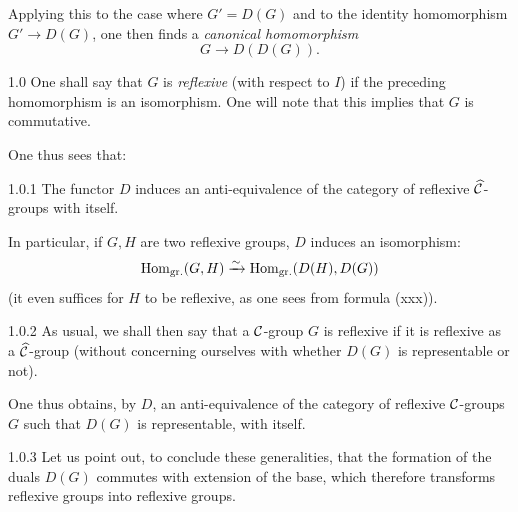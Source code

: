 Applying this to the case where $G'=D(G)$ and to the identity homomorphism $G'\to D(G)$, one then finds a \emph{canonical homomorphism}
\begin{equation}\tag{xxxx}
G\to D(D(G)).
\end{equation}
\begin{definition}{1.0}\label{VIII.1.0}
One shall say that $G$ is \emph{reflexive} (with respect to $I$) if the preceding homomorphism is an isomorphism. One will note that this implies that $G$ is commutative.
\end{definition}
One thus sees that:
\begin{proposition}{1.0.1}\label{VIII.1.0.1}
The functor $D$ induces an anti-equivalence of the category of reflexive $\widehat{\cal C}$-groups with itself.
\end{proposition}
In particular, if $G,H$ are two reflexive groups, $D$ induces an isomorphism:
\[
\Hom_{\mathrm{gr.}}(G,H)\isomto\Hom_{\mathrm{gr.}}(D(H),D(G))
\]
(it even suffices for $H$ to be reflexive, as one sees from formula (xxx)).
\begin{definition}{1.0.2}\label{VIII.1.0.2}
As usual, we shall then say that a $\cal C$-group $G$ is reflexive if it is reflexive as a $\widehat{\cal C}$-group (without concerning ourselves with whether $D(G)$ is representable or not).
\end{definition}
One thus obtains, by $D$, an anti-equivalence of the category of reflexive $\cal C$-groups $G$ such that $D(G)$ is representable, with itself.
\begin{remark}{1.0.3}\label{VIII.1.0.3}
Let us point out, to conclude these generalities, that the formation of the duals $D(G)$ commutes with extension of the base, which therefore transforms reflexive groups into reflexive groups.
\end{remark}

